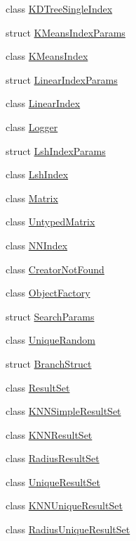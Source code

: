 \begin{DoxyCompactItemize}
class \hyperlink{classcvflann_1_1KDTreeSingleIndex}{K\-D\-Tree\-Single\-Index}
\item 
struct \hyperlink{structcvflann_1_1KMeansIndexParams}{K\-Means\-Index\-Params}
\item 
class \hyperlink{classcvflann_1_1KMeansIndex}{K\-Means\-Index}
\item 
struct \hyperlink{structcvflann_1_1LinearIndexParams}{Linear\-Index\-Params}
\item 
class \hyperlink{classcvflann_1_1LinearIndex}{Linear\-Index}
\item 
class \hyperlink{classcvflann_1_1Logger}{Logger}
\item 
struct \hyperlink{structcvflann_1_1LshIndexParams}{Lsh\-Index\-Params}
\item 
class \hyperlink{classcvflann_1_1LshIndex}{Lsh\-Index}
\item 
class \hyperlink{classcvflann_1_1Matrix}{Matrix}
\item 
class \hyperlink{classcvflann_1_1UntypedMatrix}{Untyped\-Matrix}
\item 
class \hyperlink{classcvflann_1_1NNIndex}{N\-N\-Index}
\item 
class \hyperlink{classcvflann_1_1CreatorNotFound}{Creator\-Not\-Found}
\item 
class \hyperlink{classcvflann_1_1ObjectFactory}{Object\-Factory}
\item 
struct \hyperlink{structcvflann_1_1SearchParams}{Search\-Params}
\item 
class \hyperlink{classcvflann_1_1UniqueRandom}{Unique\-Random}
\item 
struct \hyperlink{structcvflann_1_1BranchStruct}{Branch\-Struct}
\item 
class \hyperlink{classcvflann_1_1ResultSet}{Result\-Set}
\item 
class \hyperlink{classcvflann_1_1KNNSimpleResultSet}{K\-N\-N\-Simple\-Result\-Set}
\item 
class \hyperlink{classcvflann_1_1KNNResultSet}{K\-N\-N\-Result\-Set}
\item 
class \hyperlink{classcvflann_1_1RadiusResultSet}{Radius\-Result\-Set}
\item 
class \hyperlink{classcvflann_1_1UniqueResultSet}{Unique\-Result\-Set}
\item 
class \hyperlink{classcvflann_1_1KNNUniqueResultSet}{K\-N\-N\-Unique\-Result\-Set}
\item 
class \hyperlink{classcvflann_1_1RadiusUniqueResultSet}{Radius\-Unique\-Result\-Set}
\item 

\end{DoxyCompactItemize}
